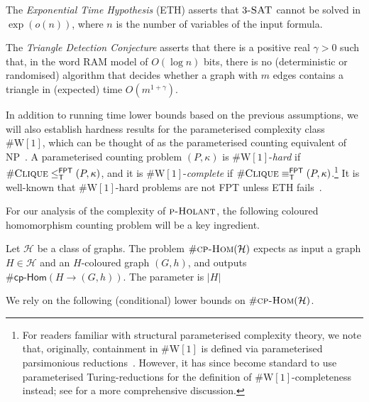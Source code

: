 \documentclass[authorcolumns,numberwithinsect]{no-lipics-v2022}
\newcommand{\W}{\mathrm{W}}
\newcommand{\cphomsprob}{\text{\sc{cp-Hom}}}
\newcommand{\fptred}{\leq^{\mathsf{FPT}}_{\mathsf{T}}}
\newcommand{\fptinterred}{\equiv^{\mathsf{FPT}}_{\mathsf{T}}}
\newcommand{\holantprob}{\text{\sc{p-Holant}}}
\newcommand{\cphoms}{\mathsf{cp}\text{-}\mathsf{Hom}}
\begin{document}
\begin{hypothesis}
    The \emph{Exponential Time Hypothesis} (ETH) asserts that $3\textsc{-SAT}$ cannot be solved in $\exp(o(n))$, where $n$ is the number of variables of the input formula. 
\end{hypothesis}

\begin{hypothesis}
    The \emph{Triangle Detection Conjecture} asserts that there is a positive real $\gamma >0$ such that, in the word RAM model of $O(\log n)$ bits, there is no (deterministic or randomised) algorithm that decides whether a graph with $m$ edges contains a triangle in (expected) time $O(m^{1+\gamma})$.
\end{hypothesis}

In addition to running time lower bounds based on the previous assumptions, we will also establish hardness results for the parameterised complexity class $\#\W[1]$, which can be thought of as the parameterised counting equivalent of $\mathrm{NP}$~\cite[Chapter 14]{FlumG06}. A parameterised counting problem $(P,\kappa)$ is $\#\W[1]$-\emph{hard} if $\#\textsc{Clique}\fptred (P,\kappa)$, and it is $\#\W[1]$-\emph{complete} if $\#\textsc{Clique}\fptinterred (P,\kappa)$.\footnote{For readers familiar with structural parameterised complexity theory, we note that, originally, containment in $\#\W[1]$ is defined via parameterised parsimonious reductions~\cite[Chapter 14]{FlumG06}. However, it has since become standard to use parameterised Turing-reductions for the definition of $\#\W[1]$-completeness instead; see \cite[Chapter 2.3.1]{Roth19} for a more comprehensive discussion.} It is well-known that $\#\W[1]$-hard problems are not FPT unless ETH fails~\cite{Chenetal05,Chenetal06,CyganFKLMPPS15}. 

For our analysis of the complexity of $\holantprob$, the following coloured homomorphism counting problem will be a key ingredient.

\begin{definition}[$\#\cphomsprob(\mathcal{H})$]
    Let $\mathcal{H}$ be a class of graphs. The problem $\#\cphomsprob(\mathcal{H})$ expects as input a graph $H\in \mathcal{H}$ and an $H$-coloured graph $(G,h)$, and outputs $\#\cphoms(H \to (G,h))$. The parameter is $|H|$
\end{definition}

We rely on the following (conditional) lower bounds on $\#\cphomsprob(\mathcal{H})$.
\end{document}
